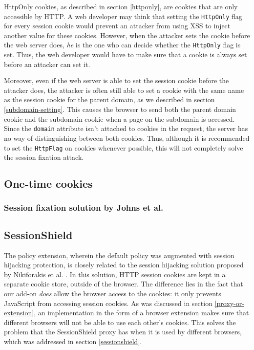 HttpOnly cookies, as described in section \ref{httponly}, are cookies that are only accessible by HTTP. A web developer may think that setting the \texttt{HttpOnly} flag for every session cookie would prevent an attacker from using XSS to inject another value for these cookies. However, when the attacker sets the cookie before the web server does, \emph{he} is the one who can decide whether the \texttt{HttpOnly} flag is set. Thus, the web developer would have to make sure that a cookie is always set before an attacker can set it.

Moreover, even if the web server is able to set the session cookie before the attacker does, the attacker is often still able to set a cookie with the same name as the session cookie for the parent domain, as we described in section \ref{subdomain-setting}. This causes the browser to send both the parent domain cookie and the subdomain cookie when a page on the subdomain is accessed. Since the \texttt{domain} attribute isn't attached to cookies in the request, the server has no way of distinguishing between both cookies. Thus, although it is recommended to set the \texttt{HttpFlag} on cookies whenever possible, this will not completely solve the session fixation attack.

\subsection{One-time cookies}


\subsubsection{Session fixation solution by Johns et al.}


\subsection{SessionShield}
The policy extension, wherein the default policy was augmented with session hijacking protection, is closely related to the session hijacking solution proposed by Nikiforakis et al. \cite{Nikiforakis2010}. In this solution, HTTP session cookies are kept in a separate cookie store, outside of the browser. The difference lies in the fact that our add-on \emph{does} allow the browser access to the cookies: it only prevents JavaScript from accessing session cookies. As was discussed in section \ref{proxy-or-extension}, an implementation in the form of a browser extension makes sure that different browsers will not be able to use each other's cookies. This solves the problem that the SessionShield proxy has when it is used by different browsers, which was addressed in section \ref{sessionshield}.
